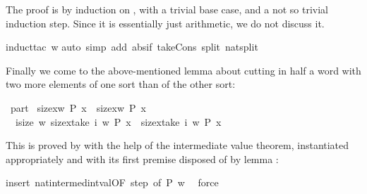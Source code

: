 \begin{isabellebody}
\begin{isamarkuptxt}
The proof is by induction on , with a trivial base case, and a not
so trivial induction step. Since it is essentially just arithmetic, we do not
discuss it.%
\end{isamarkuptxt}%
\isamarkuptrue%
\isamarkupfalse%
{\isacharparenleft}induct{\isacharunderscore}tac\ w{\isacharparenright}\isanewline
{}\isamarkupfalse%
{\isacharparenleft}auto\ simp\ add{\isacharcolon}\ abs{\isacharunderscore}if\ take{\isacharunderscore}Cons\ split{\isacharcolon}\ nat{\isachardot}split{\isacharparenright}\isanewline
{}\isamarkupfalse%
%
\endisatagproof
{\isafoldproof}%
%
\isadelimproof
%
\endisadelimproof
%
\begin{isamarkuptext}%
Finally we come to the above-mentioned lemma about cutting in half a word with two more elements of one sort than of the other sort:%
\end{isamarkuptext}%
\isamarkuptrue%
\isamarkupfalse%
\ part{}{\isacharcolon}\isanewline
\ {\isachardoublequoteopen}size{\isacharbrackleft}x{\isasymin}w{\isachardot}\ P\ x{\isacharbrackright}\ {\isacharequal}\ size{\isacharbrackleft}x{\isasymin}w{\isachardot}\ {\isasymnot}P\ x{\isacharbrackright}{\isacharplus}{}\ {\isasymLongrightarrow}\isanewline
\ \ {\isasymexists}i{\isasymle}size\ w{\isachardot}\ size{\isacharbrackleft}x{\isasymin}take\ i\ w{\isachardot}\ P\ x{\isacharbrackright}\ {\isacharequal}\ size{\isacharbrackleft}x{\isasymin}take\ i\ w{\isachardot}\ {\isasymnot}P\ x{\isacharbrackright}{\isacharplus}{}{\isachardoublequoteclose}%
\isadelimproof
%
\endisadelimproof
%
\isatagproof
%
\begin{isamarkuptxt}%
\noindent
This is proved by  with the help of the intermediate value theorem,
instantiated appropriately and with its first premise disposed of by lemma
:%
\end{isamarkuptxt}%
\isamarkuptrue%
\isamarkupfalse%
{\isacharparenleft}insert\ nat{}{\isacharunderscore}intermed{\isacharunderscore}int{\isacharunderscore}val{\isacharbrackleft}OF\ step{}{\isacharcomma}\ of\ {\isachardoublequoteopen}P{\isachardoublequoteclose}\ {\isachardoublequoteopen}w{\isachardoublequoteclose}\ {\isachardoublequoteopen}{}{\isachardoublequoteclose}{\isacharbrackright}{\isacharparenright}\isanewline
{}\isamarkupfalse%
\ force%
\endisatagproof
{\isafoldproof}%
%
\isadelimproof
%
\endisadelimproof
%
\begin{isamarkuptext}%
\noindent


\end{isamarkuptext}
\end{isabellebody}
